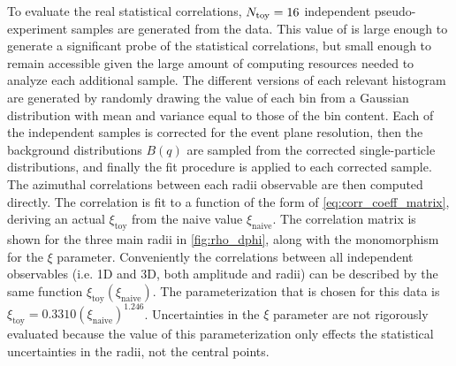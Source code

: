 To evaluate the real statistical correlations, $N_\textrm{toy} = 16$ independent pseudo-experiment samples are generated from the data.
This value of \Ntoy is large enough to generate a significant probe of the statistical correlations, but small enough to remain accessible given the large amount of computing resources needed to analyze each additional sample.
The \Ntoy different versions of each relevant histogram are generated by randomly drawing the value of each bin from a Gaussian distribution with mean and variance equal to those of the bin content.
Each of the independent \Ntoy samples is corrected for the event plane resolution, then the background distributions $B(q)$ are sampled from the corrected single-particle distributions, and finally the fit procedure is applied to each corrected sample.
The azimuthal correlations between each radii observable are then computed directly.
The correlation is fit to a function of the form of \cref{eq:corr_coeff_matrix}, deriving an actual $\xi_\textrm{toy}$ from the naive value $\xi_\textrm{naive}$.
The correlation matrix is shown for the three main radii in \cref{fig:rho_dphi}, along with the monomorphism for the $\xi$ parameter.
Conveniently the correlations between all independent observables (i.e. 1D and 3D, both amplitude and radii) can be described by the same function $\xi_\textrm{toy}\left(\xi_\textrm{naive}\right)$.
The parameterization that is chosen for this data is $ \xi_\textrm{toy} = 0.3310 (\xi_\textrm{naive})^{1.246} $.
Uncertainties in the $\xi$ parameter are not rigorously evaluated because the value of this parameterization only effects the statistical uncertainties in the radii, not the central points.

